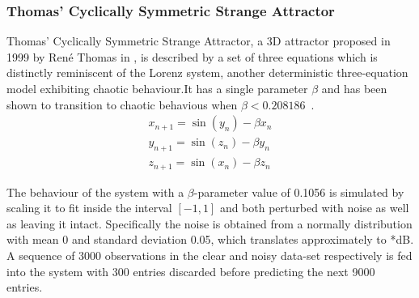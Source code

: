 \documentclass[a4paper,12pt,twoside]{report}
\begin{document}
\subsubsection{Thomas' Cyclically Symmetric Strange Attractor}
Thomas' Cyclically Symmetric Strange Attractor, a 3D attractor proposed in 1999 by Ren\'e Thomas in \cite{ThomasAttractor}, is described by a set of three equations which is distinctly reminiscent of the Lorenz system, another deterministic three-equation model exhibiting chaotic behaviour.It has a single parameter $\beta$ and has been shown to transition to chaotic behavious when $\beta<0.208186$~\cite{Thomas_BetaParameter}.
\begin{eqnarray}\label{eqns_thomas}
  x_{n+1} = \sin(y_n) - \beta{x_n} \\
  y_{n+1} = \sin(z_n) - \beta{y_n} \\
  z_{n+1} = \sin(x_n) - \beta{z_n}
\end{eqnarray}

The behaviour of the system with a $\beta$-parameter value of 0.1056 is simulated by scaling it to fit inside the interval $[-1,1]$ and both perturbed with noise as well as leaving it intact. Specifically the noise is obtained from a normally distribution with mean 0 and standard deviation 0.05, which translates approximately to *dB.
 A sequence of 3000 observations in the clear and noisy data-set respectively is fed into the system with 300 entries discarded before predicting the next 9000 entries. 
\end{document}
